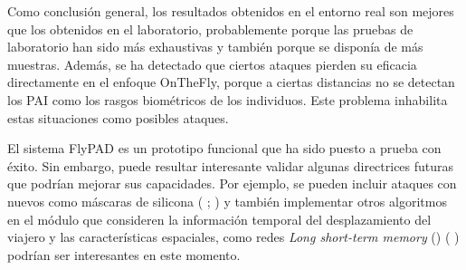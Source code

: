 Como conclusión general, los resultados obtenidos en el entorno real son mejores que los obtenidos en el laboratorio, probablemente porque las pruebas de laboratorio han sido más exhaustivas y también porque se disponía de más muestras. Además, se ha detectado que ciertos ataques pierden su eficacia directamente en el enfoque \gls{OnTheFly}, porque a ciertas distancias no se detectan los \gls{PAI} como los rasgos biométricos de los individuos. Este problema inhabilita estas situaciones como posibles ataques.

El sistema \gls{FlyPAD} es un prototipo funcional que ha sido puesto a prueba con éxito. Sin embargo, puede resultar interesante validar algunas directrices futuras que podrían mejorar sus capacidades. Por ejemplo, se pueden incluir ataques con nuevos  como máscaras de silicona ( \cite{agarwal2017swapped}; \cite{manjani2017detecting}) y también implementar otros algoritmos en el módulo  que consideren la información temporal del desplazamiento del viajero y las características espaciales, como redes \textit{Long short-term memory} () ( \cite{xu2015learning}) podrían ser interesantes en este momento.


